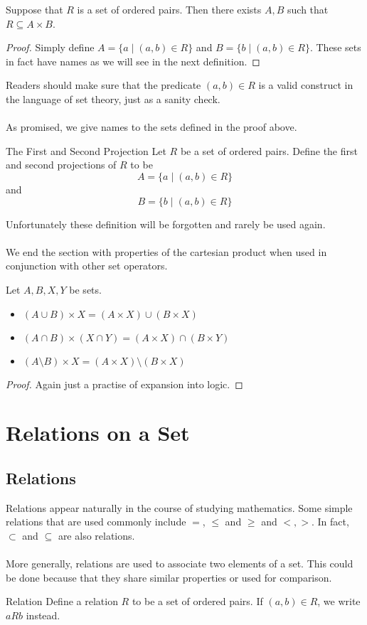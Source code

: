 \documentclass[a4paper]{article}
\begin{document}
\begin{prp}{}{} Suppose that $R$ is a set of ordered pairs. Then there exists $A,B$ such that $R\subseteq A\times B$. \tcbline
\begin{proof}
Simply define $A=\{a\;|\;(a,b)\in R\}$ and $B=\{b\;|\;(a,b)\in R\}$. These sets in fact have names as we will see in the next definition. 
\end{proof}
\end{prp}

Readers should make sure that the predicate $(a,b)\in R$ is a valid construct in the language of set theory, just as a sanity check. \\~\\
As promised, we give names to the sets defined in the proof above. 

\begin{defn}{The First and Second Projection}{} Let $R$ be a set of ordered pairs. Define the first and second projections of $R$ to be $$A=\{a\;|\;(a,b)\in R\}$$ and $$B=\{b\;|\;(a,b)\in R\}$$
\end{defn}

Unfortunately these definition will be forgotten and rarely be used again. \\~\\
We end the section with properties of the cartesian product when used in conjunction with other set operators. 

\begin{prp}{}{} Let $A,B,X,Y$ be sets. 
\begin{itemize}
\item $(A\cup B)\times X=(A\times X)\cup(B\times X)$
\item $(A\cap B)\times (X\cap Y)=(A\times X)\cap(B\times Y)$
\item $(A\setminus B)\times X=(A\times X)\setminus(B\times X)$
\end{itemize}\tcbline
\begin{proof} Again just a practise of expansion into logic. 
\end{proof}
\end{prp}

\pagebreak
\section{Relations on a Set}
\subsection{Relations}
Relations appear naturally in the course of studying mathematics. Some simple relations that are used commonly include $=$, $\leq$ and $\geq$ and $<,>$. In fact, $\subset$ and $\subseteq$ are also relations. \\~\\
More generally, relations are used to associate two elements of a set. This could be done because that they share similar properties or used for comparison. 
\begin{defn}{Relation}{} Define a relation $R$ to be a set of ordered pairs. If $(a,b)\in R$, we write $aRb$ instead. 
\end{defn}
\end{document}
